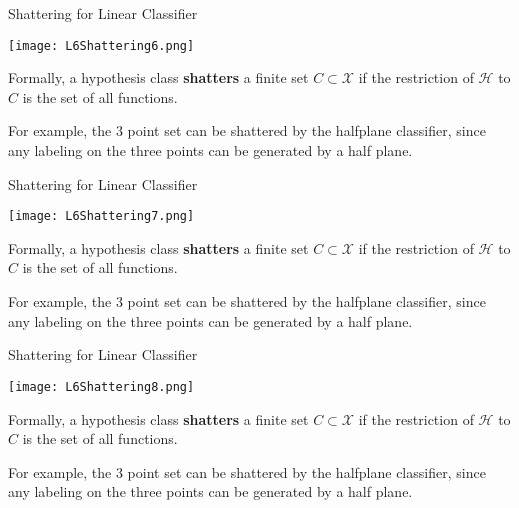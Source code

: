 \documentclass[10pt, table, dvipsnames, handout]{beamer}
\newcommand{\cX}{\ensuremath{\mathcal{X}}}
\newcommand{\cH}{\ensuremath{\mathcal{H}}}
\begin{document}
\begin{frame}[fragile]{Shattering for Linear Classifier}
  \begin{minipage}[t][0.6\textheight][t]{\textwidth}
	\centering \texttt{[image: L6Shattering6.png]} 
  \end{minipage}
  \vfill
  \begin{minipage}[t][0.4\textheight][t]{\textwidth}
Formally, a hypothesis class \textbf{shatters} a finite set $C\subset\cX$ if the restriction of $\cH$ to $C$ is the set of all functions. 

For example, the 3 point set can be shattered by the halfplane classifier, since any labeling on the three points can be generated by a half plane.
\end{minipage}

\end{frame}


\begin{frame}[fragile]{Shattering for Linear Classifier}
  \begin{minipage}[t][0.6\textheight][t]{\textwidth}
	\centering \texttt{[image: L6Shattering7.png]} 
  \end{minipage}
  \vfill
  \begin{minipage}[t][0.4\textheight][t]{\textwidth}
Formally, a hypothesis class \textbf{shatters} a finite set $C\subset\cX$ if the restriction of $\cH$ to $C$ is the set of all functions. 

For example, the 3 point set can be shattered by the halfplane classifier, since any labeling on the three points can be generated by a half plane.
\end{minipage}

\end{frame}


\begin{frame}[fragile]{Shattering for Linear Classifier}
  \begin{minipage}[t][0.6\textheight][t]{\textwidth}
	\centering \texttt{[image: L6Shattering8.png]} 
  \end{minipage}
  \vfill
  \begin{minipage}[t][0.4\textheight][t]{\textwidth}
Formally, a hypothesis class \textbf{shatters} a finite set $C\subset\cX$ if the restriction of $\cH$ to $C$ is the set of all functions. 

For example, the 3 point set can be shattered by the halfplane classifier, since any labeling on the three points can be generated by a half plane.
\end{minipage}

\end{frame}
\end{document}
